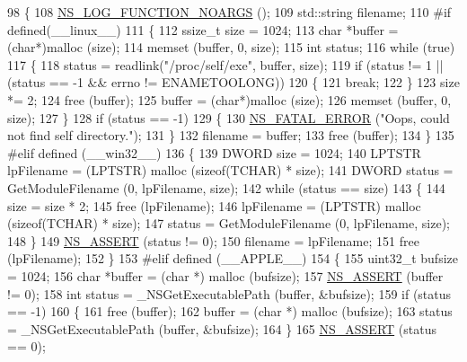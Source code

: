 \begin{DoxyCode}
98 \{
108   \hyperlink{log-macros-disabled_8h_a8f7e4afc291c9d29a65c18ac1f79197b}{NS\_LOG\_FUNCTION\_NOARGS} ();
109   std::string filename;
110 \textcolor{preprocessor}{#if defined(\_\_linux\_\_)}
111   \{
112     ssize\_t size = 1024;
113     \textcolor{keywordtype}{char} *buffer = (\textcolor{keywordtype}{char}*)malloc (size);
114     memset (buffer, 0, size);
115     \textcolor{keywordtype}{int} status;
116     \textcolor{keywordflow}{while} (\textcolor{keyword}{true})
117       \{
118         status = readlink(\textcolor{stringliteral}{"/proc/self/exe"}, buffer, size);
119         \textcolor{keywordflow}{if} (status != 1 || (status == -1 && errno != ENAMETOOLONG))
120           \{
121             \textcolor{keywordflow}{break};
122           \}
123         size *= 2;
124         free (buffer);
125         buffer = (\textcolor{keywordtype}{char}*)malloc (size);
126         memset (buffer, 0, size);
127       \}
128     \textcolor{keywordflow}{if} (status == -1)
129       \{
130         \hyperlink{group__fatal_ga5131d5e3f75d7d4cbfd706ac456fdc85}{NS\_FATAL\_ERROR} (\textcolor{stringliteral}{"Oops, could not find self directory."});
131       \}
132     filename = buffer;
133     free (buffer);
134   \}
135 \textcolor{preprocessor}{#elif defined (\_\_win32\_\_)}
136   \{
139     DWORD size = 1024;
140     LPTSTR lpFilename = (LPTSTR) malloc (\textcolor{keyword}{sizeof}(TCHAR) * size);
141     DWORD status = GetModuleFilename (0, lpFilename, size);
142     \textcolor{keywordflow}{while} (status == size)
143       \{
144         size = size * 2;
145         free (lpFilename);
146         lpFilename = (LPTSTR) malloc (\textcolor{keyword}{sizeof}(TCHAR) * size);
147         status = GetModuleFilename (0, lpFilename, size);
148       \}
149     \hyperlink{assert_8h_a6dccdb0de9b252f60088ce281c49d052}{NS\_ASSERT} (status != 0);
150     filename = lpFilename;
151     free (lpFilename);
152   \}
153 \textcolor{preprocessor}{#elif defined (\_\_APPLE\_\_)}
154   \{
155     uint32\_t bufsize = 1024;
156     \textcolor{keywordtype}{char} *buffer = (\textcolor{keywordtype}{char} *) malloc (bufsize);
157     \hyperlink{assert_8h_a6dccdb0de9b252f60088ce281c49d052}{NS\_ASSERT} (buffer != 0);
158     \textcolor{keywordtype}{int} status = \_NSGetExecutablePath (buffer, &bufsize);
159     \textcolor{keywordflow}{if} (status == -1)
160       \{
161         free (buffer);
162         buffer = (\textcolor{keywordtype}{char} *) malloc (bufsize);
163         status = \_NSGetExecutablePath (buffer, &bufsize);
164       \}
165     \hyperlink{assert_8h_a6dccdb0de9b252f60088ce281c49d052}{NS\_ASSERT} (status == 0);

\end{DoxyCode}
